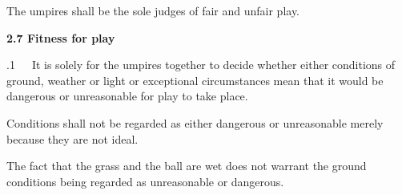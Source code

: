 \documentclass[12pt]{article}
\begin{document}
\vspace{\baselineskip}
{\fontsize{9pt}{10.8pt}\selectfont The umpires shall be the sole judges of fair and unfair play.\par}\par


\vspace{\baselineskip}
{\fontsize{11pt}{13.2pt}\selectfont \textbf{2.7 \tabto{0.47in} Fitness for play}\par}\par


\vspace{\baselineskip}
\begin{adjustwidth}{0.0in}{0.49in}
\begin{FlushRight}
{\fontsize{9pt}{10.8pt}.1\ \ \  It is solely for the umpires together to decide whether either conditions of ground, weather or light or exceptional circumstances mean that it would be dangerous or unreasonable for play to take place.\par}
\end{FlushRight}\par

\end{adjustwidth}


\vspace{\baselineskip}

\vspace{\baselineskip}

\vspace{\baselineskip}
\begin{adjustwidth}{0.0in}{-0.01in}
\begin{Center}
{\fontsize{8pt}{9.6pt}\par}
\end{Center}\par

\end{adjustwidth}


\vspace{\baselineskip}
\begin{adjustwidth}{0.5in}{0.0in}
{\fontsize{9pt}{10.8pt}\selectfont Conditions shall not be regarded as either dangerous or unreasonable merely because they are not ideal.\par}\par

\end{adjustwidth}


\vspace{\baselineskip}
\begin{adjustwidth}{0.5in}{0.39in}
{\fontsize{9pt}{10.8pt}\selectfont The fact that the grass and the ball are wet does not warrant the ground conditions being regarded as unreasonable or dangerous.\par}\par

\end{adjustwidth}
\end{document}
